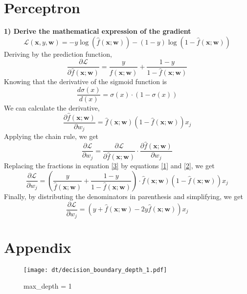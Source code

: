\documentclass[acmconf,nonacm=true]{acmart}
\begin{document}
\section{Perceptron}
\textbf{1) Derive the mathematical expression of the gradient}
$$
\mathcal{L}(\mathbf{x}, y, \mathbf{w})=-y \log (\hat{f}(\mathbf{x} ; \mathbf{w}))-(1-y) \log (1-\hat{f}(\mathbf{x} ; \mathbf{w}))
$$
Deriving by the prediction function,
\begin{equation*} \label{1}
    \frac{\partial \mathcal{L}}{\partial \hat{f}(\mathbf{x} ; \mathbf{w})}=\frac{y}{\hat{f}(\mathbf{x} ; \mathbf{w})}+\frac{1-y}{1-\hat{f}(\mathbf{x} ; \mathbf{w})} \tag{1}
\end{equation*}
Knowing that the derivative of the sigmoid function is
\begin{equation*}
\frac{d\sigma (x)}{d(x)} = \sigma (x)\cdot (1-\sigma(x))
\end{equation*}
We can calculate the derivative,
\begin{equation} \label{2}
\frac{\partial \hat{f}(\mathbf{x} ; \mathbf{w})}{\partial w_j}=\hat{f}(\mathbf{x} ; \mathbf{w})(1-\hat{f}(\mathbf{x} ; \mathbf{w})) x_j \tag{2}
\end{equation}
Applying the chain rule, we get
\begin{equation*} \label{3}
\frac{\partial \mathcal{L}}{\partial w_j}=\frac{\partial \mathcal{L}}{\partial \hat{f}(\mathbf{x} ; \mathbf{w})} \cdot \frac{\partial \hat{f}(\mathbf{x} ;\mathbf{w})}{\partial w_{j}} \tag{3}
\end{equation*}
Replacing the fractions in equation \ref{3} by equations \ref{1} and \ref{2}, we get
\begin{equation*}
\frac{\partial \mathcal{L}}{\partial w_j}=\left(\frac{y}{\hat{f}(\mathbf{x} ; \mathbf{w})}+\frac{1-y}{1-\hat{f}(\mathbf{x} ; \mathbf{w})}\right) \cdot \hat{f}(\mathbf{x} ; \mathbf{w})(1-\hat{f}(\mathbf{x} ; \mathbf{w})) x_j
\end{equation*}
Finally, by distributing the denominators in parenthesis and simplifying, we get
\begin{equation*}
\frac{\partial \mathcal{L}}{\partial w_j}=(y+\hat{f}(\mathbf{x} ; \mathbf{w})-2 y \hat{f}(\mathbf{x} ; \mathbf{w})) x_j
\end{equation*}


\section{Appendix}


\begin{figure}[H]
    \centering  
    \texttt{[image: dt/decision\_boundary\_depth\_1.pdf]}
    \caption{max\_depth = 1}
\end{figure}
\end{document}

